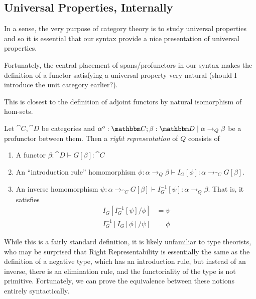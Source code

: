 \documentclass{article}
\begin{document}
\subsection{Universal Properties, Internally}

In a sense, the very purpose of category theory is to study universal
properties and so it is essential that our syntax provide a nice
presentation of universal properties.

Fortunately, the central placement of spans/profunctors in our syntax
makes the definition of a functor satisfying a universal property very
natural (should I introduce the unit category earlier?).

This is closest to the definition of adjoint functors by natural
isomorphism of hom-sets.
\begin{definition}
  Let $\cat C, \cat D$ be categories and $\alpha^o : \cat C;\beta :
  \cat D \pipe \alpha \to_{Q} \beta$ be a profunctor between them. Then a \emph{right
    representation} of $Q$ consists of
  \begin{enumerate}
  \item A functor $\beta : \cat D \vdash G[\beta] : \cat C$
  \item An ``introduction rule'' homomorphism $\phi: \alpha \to_{Q}
    \beta \vdash I_G[\phi] : \alpha \to_{\cat C} G[\beta]$.
  \item An inverse homomorphism $\psi: \alpha \to_{\cat C} G[\beta]
    \vdash I_G^{-1}[\psi] : \alpha \to_{Q} \beta$. That is, it satisfies
    \begin{align*}
      I_G[I_G^{-1}[\psi]/\phi] &= \psi\\
      I_G^{-1}[I_G[\phi]/\psi] &= \phi
    \end{align*}
  \end{enumerate}
\end{definition}

While this is a fairly standard definition, it is likely unfamiliar to
type theorists, who may be surprised that Right Representability is
essentially the same as the definition of a negative type, which has
an introduction rule, but instead of an inverse, there is an
elimination rule, and the functoriality of the type is not primitive.
Fortunately, we can prove the equivalence between these notions
entirely syntactically.
\end{document}
